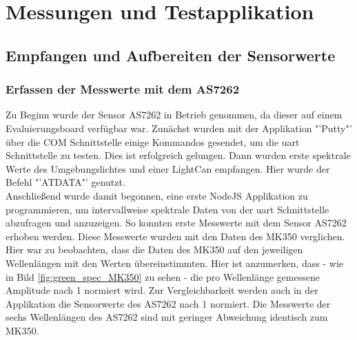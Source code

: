 \documentclass[11pt]{scrartcl}
\begin{document}
\section{Messungen und Testapplikation}
\subsection{Empfangen und Aufbereiten der Sensorwerte}
\subsubsection{Erfassen der Messwerte mit dem AS7262} \label{measureWithAS7262}
Zu Beginn wurde der Sensor AS7262 in Betrieb genommen, da dieser auf einem Evaluierungsboard verfügbar war.
Zunächst wurden mit der Applikation "'Putty"' über die COM Schnittstelle einige Kommandos gesendet, um die
\ac{uart} Schnittstelle zu testen. Dies ist erfolgreich gelungen. Dann wurden erste spektrale Werte des
Umgebungslichtes und einer LightCan empfangen. Hier wurde der Befehl "'ATDATA"' genutzt.\\
Anschließend wurde damit begonnen, eine erste NodeJS Applikation zu programmieren, um intervallweise spektrale Daten
von der \ac{uart} Schnittstelle abzufragen und anzuzeigen. So konnten erste Messwerte mit dem Sensor AS7262 erhoben werden.
Diese Messwerte wurden mit den Daten des MK350 verglichen. Hier war zu beobachten, dass die Daten des MK350 auf den jeweiligen
Wellenlängen mit den Werten übereinstimmten. Hier ist anzumerken, dass - wie in Bild \ref{fig:green_spec_MK350} zu sehen - die pro Wellenlänge
gemessene Amplitude nach 1 normiert wird. Zur Vergleichbarkeit werden auch in der Applikation die Sensorwerte des AS7262 nach
1 normiert. Die Messwerte der sechs Wellenlängen des AS7262 sind mit geringer Abweichung identisch zum MK350.\\
\end{document}
